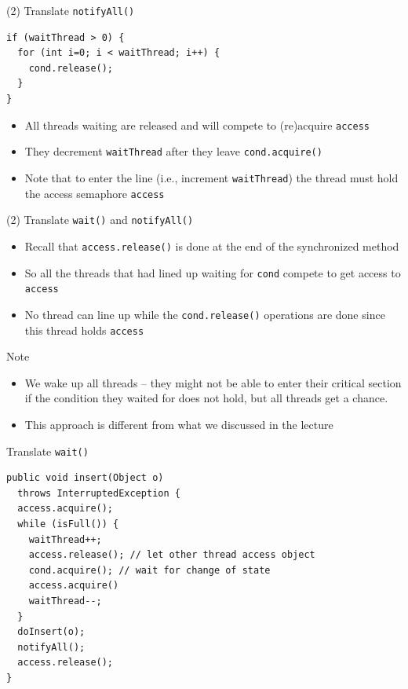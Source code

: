 \begin{frame}[fragile]{(2) Translate \lstinline!notifyAll()!}
\begin{lstlisting}
if (waitThread > 0) {
  for (int i=0; i < waitThread; i++) { 
    cond.release();
  }
}	
\end{lstlisting}


  \begin{itemize}
  \item All threads waiting are released and will compete to
    (re)acquire \lstinline!access!
  \item They decrement \lstinline!waitThread! after they leave
    \lstinline!cond.acquire()!
  \item Note that to enter the line (i.e., increment
    \lstinline!waitThread!) the thread must hold the access semaphore
    \lstinline!access!
  \end{itemize}
\end{frame}

\begin{frame}{(2) Translate \lstinline!wait()! and \lstinline!notifyAll()!}
  \begin{itemize}
  \item Recall that \lstinline!access.release()! is done at the end of the
    synchronized method
  \item So all the threads that had lined up waiting for
    \lstinline!cond! compete to get access to \lstinline!access!
  \item No thread can line up while the \lstinline!cond.release()!
    operations are done since this thread holds \lstinline!access!
  \end{itemize}
\end{frame}

\begin{frame}{Note}
  \begin{itemize}
  \item We wake up all threads -- they might not be able to enter
    their critical section if the condition they waited for does not
    hold, but all threads get a chance.
  \item This approach is different from what we discussed in the
    lecture
  \end{itemize}
\end{frame}

\begin{frame}[fragile]{Translate \lstinline!wait()!}
\begin{lstlisting}[basicstyle=\fontsize{9}{11}\selectfont\ttfamily]
public void insert(Object o)
  throws InterruptedException {
  access.acquire();
  while (isFull()) {
    waitThread++;
    access.release(); // let other thread access object
    cond.acquire(); // wait for change of state
    access.acquire()
    waitThread--;
  }
  doInsert(o);	
  notifyAll();
  access.release();
}
\end{lstlisting}
\end{frame}

